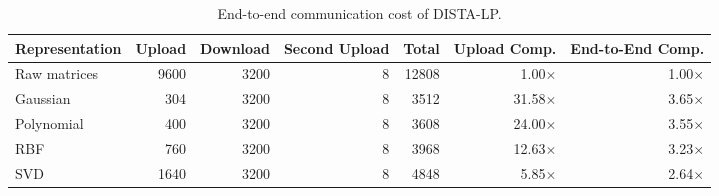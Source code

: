 \begin{table}[t]
\centering
\caption{End-to-end communication cost of DISTA-LP.}
\label{tab:communication-cost}
\begin{tabular}{lrrrrrr}
\toprule
Representation & Upload & Download & Second Upload & Total & Upload Comp. & End-to-End Comp. \\
\midrule
Raw matrices & 9600 & 3200 & 8 & 12808 & 1.00$\times$ & 1.00$\times$ \\
Gaussian & 304 & 3200 & 8 & 3512 & 31.58$\times$ & 3.65$\times$ \\
Polynomial & 400 & 3200 & 8 & 3608 & 24.00$\times$ & 3.55$\times$ \\
RBF & 760 & 3200 & 8 & 3968 & 12.63$\times$ & 3.23$\times$ \\
SVD & 1640 & 3200 & 8 & 4848 & 5.85$\times$ & 2.64$\times$ \\
\bottomrule
\end{tabular}
\end{table}

